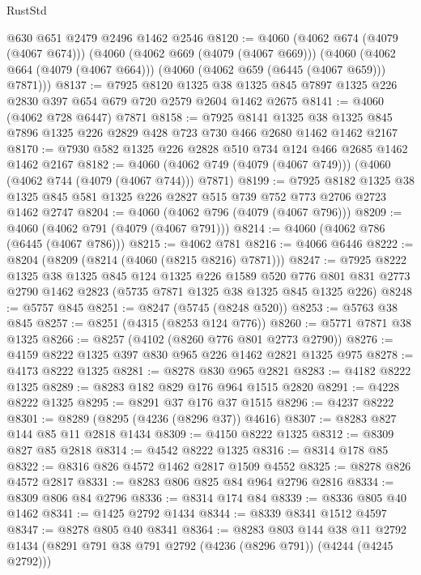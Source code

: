 \begin{lexlean}{RustStd}
\begin{coremodule}
    @630
    @651
    @2479
    @2496
    @1462
    @2546
@8120 := @4060
    (@4062 @674 (@4079 (@4067 @674)))
    (@4060
      (@4062 @669 (@4079 (@4067 @669)))
      (@4060 (@4062 @664 (@4079 (@4067 @664))) (@4060 (@4062 @659 (@6445 (@4067 @659))) @7871)))
@8137 := @7925
    @8120
    @1325
    @38
    @1325
    @845
    @7897
    @1325
    @226
    @2830
    @397
    @654
    @679
    @720
    @2579
    @2604
    @1462
    @2675
@8141 := @4060 (@4062 @728 @6447) @7871
@8158 := @7925
    @8141
    @1325
    @38
    @1325
    @845
    @7896
    @1325
    @226
    @2829
    @428
    @723
    @730
    @466
    @2680
    @1462
    @1462
    @2167
@8170 := @7930 @582 @1325 @226 @2828 @510 @734 @124 @466 @2685 @1462 @1462 @2167
@8182 := @4060 (@4062 @749 (@4079 (@4067 @749))) (@4060 (@4062 @744 (@4079 (@4067 @744))) @7871)
@8199 := @7925
    @8182
    @1325
    @38
    @1325
    @845
    @581
    @1325
    @226
    @2827
    @515
    @739
    @752
    @773
    @2706
    @2723
    @1462
    @2747
@8204 := @4060 (@4062 @796 (@4079 (@4067 @796)))
@8209 := @4060 (@4062 @791 (@4079 (@4067 @791)))
@8214 := @4060 (@4062 @786 (@6445 (@4067 @786)))
@8215 := @4062 @781
@8216 := @4066 @6446
@8222 := @8204 (@8209 (@8214 (@4060 (@8215 @8216) @7871)))
@8247 := @7925
    @8222
    @1325
    @38
    @1325
    @845
    @124
    @1325
    @226
    @1589
    @520
    @776
    @801
    @831
    @2773
    @2790
    @1462
    @2823
    (@5735 @7871 @1325 @38 @1325 @845 @1325 @226)
@8248 := @5757 @845
@8251 := @8247 (@5745 (@8248 @520))
@8253 := @5763 @38 @845
@8257 := @8251 (@4315 (@8253 @124 @776))
@8260 := @5771 @7871 @38 @1325
@8266 := @8257 (@4102 (@8260 @776 @801 @2773 @2790))
@8276 := @4159 @8222 @1325 @397 @830 @965 @226 @1462 @2821 @1325 @975
@8278 := @4173 @8222 @1325
@8281 := @8278 @830 @965 @2821
@8283 := @4182 @8222 @1325
@8289 := @8283 @182 @829 @176 @964 @1515 @2820
@8291 := @4228 @8222 @1325
@8295 := @8291 @37 @176 @37 @1515
@8296 := @4237 @8222
@8301 := @8289 (@8295 (@4236 (@8296 @37)) @4616)
@8307 := @8283 @827 @144 @85 @11 @2818 @1434
@8309 := @4150 @8222 @1325
@8312 := @8309 @827 @85 @2818
@8314 := @4542 @8222 @1325
@8316 := @8314 @178 @85
@8322 := @8316 @826 @4572 @1462 @2817 @1509 @4552
@8325 := @8278 @826 @4572 @2817
@8331 := @8283 @806 @825 @84 @964 @2796 @2816
@8334 := @8309 @806 @84 @2796
@8336 := @8314 @174 @84
@8339 := @8336 @805 @40 @1462
@8341 := @1425 @2792 @1434
@8344 := @8339 @8341 @1512 @4597
@8347 := @8278 @805 @40 @8341
@8364 := @8283
    @803
    @144
    @38
    @11
    @2792
    @1434
    (@8291 @791 @38 @791 @2792 (@4236 (@8296 @791)) (@4244 (@4245 @2792)))

\end{coremodule}
\end{lexlean}
